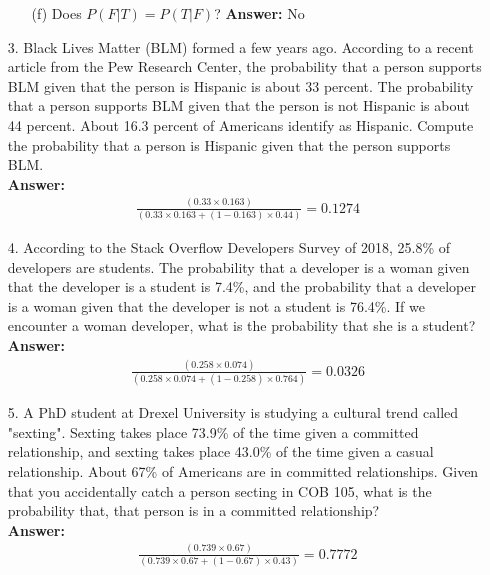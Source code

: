 \documentclass[a4paper]{article}
\begin{document}
\begin{itemize}
\begin{itemize}
        \item[(f)] Does $P(F|T) = P(T|F)$?
        \textbf{Answer:} No 
    \end{itemize}
	\item[3.] Black Lives Matter (BLM) formed a few years ago. According to a recent article from the Pew Research Center, the probability that a person supports BLM given that the person is Hispanic is about 33 percent. The probability that a person supports BLM given that the person is not Hispanic is about 44 percent. About 16.3 percent of Americans identify as Hispanic. Compute the probability that a person is Hispanic given that the person supports BLM. \\
    \textbf{Answer:}  
    \begin{equation}
        \begin{split}
            \frac{(0.33 \times 0.163)}{(0.33 \times 0.163 + (1 - 0.163) \times 0.44)} = 0.1274
        \end{split}
    \end{equation} 
	\item[4.] According to the Stack Overflow Developers Survey of 2018, 25.8\% of developers are students. The probability that a developer is a woman given that the developer is a student is 7.4\%, and the probability that a developer is a woman given that the developer is not a student is 76.4\%. If we encounter a woman developer, what is the probability that she is a student? \\
    \textbf{Answer:} 
    \begin{equation}
        \begin{split}
            \frac{(0.258 \times 0.074)}{(0.258 \times 0.074 + (1 - 0.258) \times 0.764)} = 0.0326
        \end{split}
    \end{equation} 
	\item[5.] A PhD student at Drexel University is studying a cultural trend called "sexting". Sexting takes place 73.9\% of the time given a committed relationship, and sexting takes place 43.0\% of the time given a casual relationship. About 67\% of Americans are in committed relationships. Given that you accidentally catch a person secting in COB 105, what is the probability that, that person is in a committed relationship? \\
    \textbf{Answer:}  
    \begin{equation}
        \begin{split}
            \frac{(0.739 \times 0.67)}{(0.739 \times 0.67 + (1 - 0.67) \times 0.43)} = 0.7772

\end{split}
\end{equation}
\end{itemize}
\end{document}
